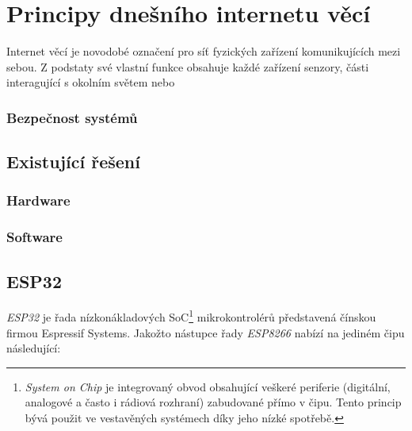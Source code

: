 \chapter{Principy dnešního internetu věcí}
\label{ch:principy-iot}
Internet věcí je novodobé označení pro síť fyzických zařízení komunikujících mezi sebou.
Z podstaty své vlastní funkce obsahuje každé zařízení senzory, části interagující s okolním světem nebo





\subsection{Bezpečnost systémů}


\section{Existující řešení}
\subsection{Hardware}

\subsection{Software}

\section{ESP32}\label{sec:esp32}
\textit{ESP32} je řada nízkonákladových SoC\footnote{\textit{System on Chip} je integrovaný obvod obsahující veškeré
periferie (digitální, analogové a často i rádiová rozhraní) zabudované přímo v čipu.
Tento princip bývá použit ve vestavěných systémech díky jeho nízké spotřebě.} mikrokontrolérů představená čínskou
firmou Espressif Systems.
Jakožto nástupce řady \textit{ESP8266} nabízí na jediném čipu následující:

